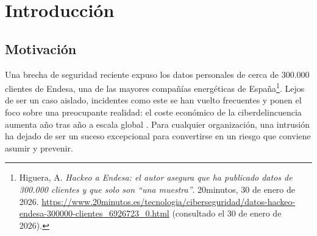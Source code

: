 \documentclass[11pt,spanish,listoffigures,listoftables]{tfgetsinf}
\begin{document}

\mainmatter



\chapter{Introducci\'on}
    \section{Motivaci\'on}
    Una brecha de seguridad reciente expuso los datos personales de cerca de 300.000 clientes de Endesa, una de las mayores compañías energéticas de España\footnote{Higuera, A. \textit{Hackeo a Endesa: el autor asegura que ha publicado datos de 300.000 clientes y que solo son ``una muestra''}. 20minutos, 30 de enero de 2026. \url{https://www.20minutos.es/tecnologia/ciberseguridad/datos-hackeo-endesa-300000-clientes_6926723_0.html} (consultado el 30 de enero de 2026).}. Lejos de ser un caso aislado, incidentes como este se han vuelto frecuentes y ponen el foco sobre una preocupante realidad: el coste económico de la ciberdelincuencia aumenta año tras año a escala global \cite{costdatabreach}. Para cualquier organización, una intrusión ha dejado de ser un suceso excepcional para convertirse en un riesgo que conviene asumir y prevenir.
\end{document}
